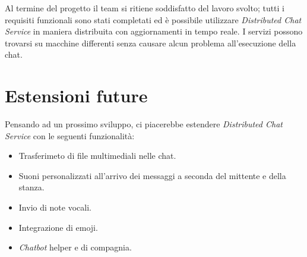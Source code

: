 Al termine del progetto il team si ritiene soddisfatto del lavoro svolto; tutti i requisiti funzionali sono stati completati ed è possibile utilizzare \textit{Distributed Chat Service} in maniera distribuita con aggiornamenti in tempo reale.
I servizi possono trovarsi su macchine differenti senza causare alcun problema all'esecuzione della chat.

\section{Estensioni future}

Pensando ad un prossimo sviluppo, ci piacerebbe estendere \textit{Distributed Chat Service} con le seguenti funzionalità:

\begin{itemize}
%
    \item Trasferimeto di file multimediali nelle chat.
%
    \item Suoni personalizzati all'arrivo dei messaggi a seconda del mittente e della stanza.
%
    \item Invio di note vocali.
%
    \item Integrazione di emoji.
%
    \item \textit{Chatbot} helper e di compagnia.
\end{itemize}
